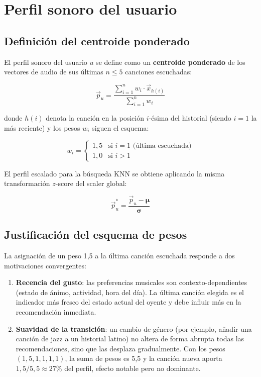 \documentclass[12pt, a4paper]{book}
\theoremstyle{definition}
\begin{document}
\section{Perfil sonoro del usuario}
\label{sec:perfil_usuario}

\subsection{Definición del centroide ponderado}

El perfil sonoro del usuario $u$ se define como un \textbf{centroide
ponderado} de los vectores de audio de sus últimas $n \leq 5$ canciones
escuchadas:

\begin{equation}
\label{eq:perfil}
\vec{p}_u = \frac{\displaystyle\sum_{i=1}^{n} w_i \cdot \vec{x}_{h(i)}}
                 {\displaystyle\sum_{i=1}^{n} w_i}
\end{equation}

donde $h(i)$ denota la canción en la posición $i$-ésima del historial
(siendo $i=1$ la más reciente) y los pesos $w_i$ siguen el esquema:

\begin{equation}
\label{eq:pesos}
w_i = \begin{cases} 1{,}5 & \text{si } i = 1 \text{ (última escuchada)} \\
                    1{,}0 & \text{si } i > 1 \end{cases}
\end{equation}

El perfil escalado para la búsqueda KNN se obtiene aplicando la misma
transformación $z$-score del scaler global:

\begin{equation}
\label{eq:perfil_escalado}
\vec{p}_u^* = \frac{\vec{p}_u - \boldsymbol{\mu}}{\boldsymbol{\sigma}}
\end{equation}

\subsection{Justificación del esquema de pesos}

La asignación de un peso 1{,}5 a la última canción escuchada responde a
dos motivaciones convergentes:

\begin{enumerate}
  \item \textbf{Recencia del gusto}: las preferencias musicales son
        contexto-dependientes (estado de ánimo, actividad, hora del día).
        La última canción elegida es el indicador más fresco del estado
        actual del oyente y debe influir más en la recomendación inmediata.

  \item \textbf{Suavidad de la transición}: un cambio de género (por
        ejemplo, añadir una canción de jazz a un historial latino) no altera
        de forma abrupta todas las recomendaciones, sino que las desplaza
        gradualmente. Con los pesos $(1{,}5, 1, 1, 1, 1)$, la suma de pesos
        es 5{,}5 y la canción nueva aporta $1{,}5 / 5{,}5 \approx 27\%$ del
        perfil, efecto notable pero no dominante.
\end{enumerate}
\end{document}
